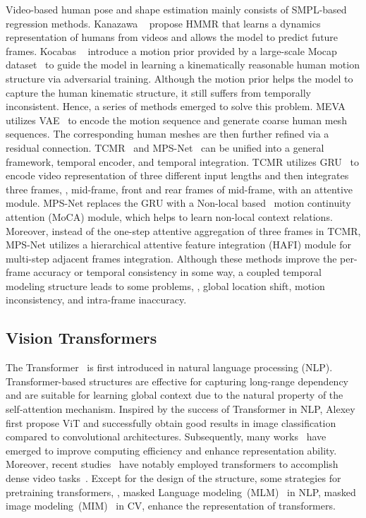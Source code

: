 \documentclass[10pt,twocolumn,letterpaper]{article}
\begin{document}
Video-based human pose and shape estimation mainly consists of SMPL-based regression methods. Kanazawa \etal~\cite{Insta} propose HMMR that learns a dynamics representation of humans from videos and allows the model to predict future frames. 
	Kocabas \etal~\cite{VIBE} introduce a motion prior provided by a large-scale Mocap dataset~\cite{AMASS} to guide the model in learning a kinematically reasonable human motion structure via adversarial training. Although the motion prior helps the model to capture the human kinematic structure, it still suffers from temporally inconsistent. Hence, a series of methods emerged to solve this problem.
	MEVA~\cite{MEVA} utilizes VAE~\cite{VAE} to encode the motion sequence and generate coarse human mesh sequences. The corresponding human meshes are then further refined via a residual connection. 
	TCMR~\cite{TCMR} and MPS-Net~\cite{MPS-net} can be unified into a general framework, \ie temporal encoder, and temporal integration. TCMR utilizes GRU~\cite{GRU} to encode video representation of three different input lengths and then integrates three frames, \ie, mid-frame, front and rear frames of mid-frame, with an attentive module.
	MPS-Net replaces the GRU with a Non-local based~\cite{Non_local} motion continuity attention (MoCA) module, which helps to learn non-local context relations. Moreover, instead of the one-step attentive aggregation of three frames in TCMR, MPS-Net utilizes a hierarchical attentive feature integration (HAFI) module for multi-step adjacent frames integration.
	Although these methods improve the per-frame accuracy or temporal consistency in some way, a coupled temporal modeling structure leads to some problems, \eg, global location shift, motion inconsistency, and intra-frame inaccuracy.
	
	\subsection{Vision Transformers}
	The Transformer~\cite{Transformer} is first introduced in natural language processing (NLP). Transformer-based structures are effective for capturing long-range dependency and are suitable for learning global context due to the natural property of the self-attention mechanism. 
	Inspired by the success of Transformer in NLP, Alexey \etal \cite{VIT} first propose ViT and successfully obtain good results in image classification compared to convolutional architectures. 
	Subsequently, many works~\cite{MatthijsDouze2020TrainingDI, T2T, ZeLiu2021SwinTH, zhao2022centerclip} have emerged to improve computing efficiency and enhance representation ability. 
    Moreover, recent studies~\cite{yang2021associating,yang2022decoupling,liang2023local,li2022locality,zhou2022survey} have notably employed transformers to accomplish dense video tasks~\cite{miao2021vspw,miao2022large}. 
Except for the design of the structure, some strategies for pretraining transformers, \eg, masked Language modeling~(MLM)~\cite{BERT} in NLP, masked image modeling~(MIM)~\cite{MAE, BEIT} in CV, enhance the representation of transformers.
	
\end{document}

